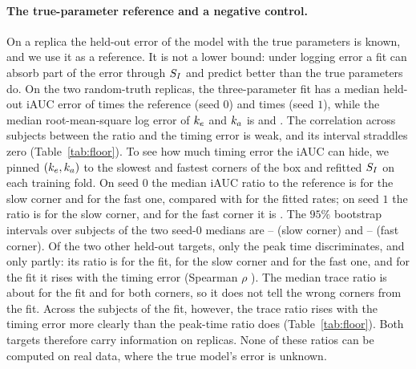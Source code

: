 \paragraph{The true-parameter reference and a negative control.}
On a replica the held-out error of the model with the true parameters is known, and we use it as a reference. It is not a lower bound: under logging error a fit can absorb part of the error through $S_I$ and predict better than the true parameters do.
On the two random-truth replicas, the three-parameter fit has a median held-out iAUC error of \resPvpRandomZeroRatio{} times the reference (seed $0$) and \resPvpRandomOneRatio{} times (seed $1$), while the median root-mean-square log error of $k_e$ and $k_a$ is \resPvpRandomZeroTiming{} and \resPvpRandomOneTiming.
The correlation across subjects between the ratio and the timing error is weak, and its interval straddles zero (Table~\ref{tab:floor}).
To see how much timing error the iAUC can hide, we pinned $(k_e,k_a)$ to the slowest and fastest corners of the box and refitted $S_I$ on each training fold.
On seed $0$ the median iAUC ratio to the reference is \resNegZeroSlowRefitIauc{} for the slow corner and \resNegZeroFastRefitIauc{} for the fast one, compared with \resPvpRandomZeroRatio{} for the fitted rates; on seed $1$ the ratio is \resNegOneSlowRefitIauc{} for the slow corner, and for the fast corner it is \resNegOneFastRefitIauc.
The $95\%$ bootstrap intervals over subjects of the two seed-$0$ medians are \resNegZeroSlowRefitIaucLow--\resNegZeroSlowRefitIaucHigh{} (slow corner) and \resNegZeroFastRefitIaucLow--\resNegZeroFastRefitIaucHigh{} (fast corner).
Of the two other held-out targets, only the peak time discriminates, and only partly: its ratio is \resFloorPeakRandomZeroThreeRatio{} for the fit, \resNegZeroSlowRefitPeak{} for the slow corner and \resNegZeroFastRefitPeak{} for the fast one, and for the fit it rises with the timing error (Spearman $\rho$ \resFloorPeakRandomZeroThreeRho).
The median trace ratio is about \resFloorTraceRandomZeroThreeRatio{} for the fit and for both corners, so it does not tell the wrong corners from the fit.
Across the subjects of the fit, however, the trace ratio rises with the timing error more clearly than the peak-time ratio does (Table~\ref{tab:floor}).
Both targets therefore carry information on replicas. None of these ratios can be computed on real data, where the true model's error is unknown.

